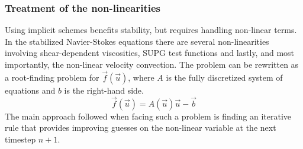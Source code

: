 \subsubsection*{Treatment of the non-linearities}
Using implicit schemes benefits stability, but requires handling non-linear terms. In the stabilized Navier-Stokes equations there are several non-linearities involving shear-dependent viscosities, SUPG test functions and lastly, and most importantly, the non-linear velocity convection. The problem can be rewritten as a root-finding problem for $\vec{f}(\vec{u})$, where $A$ is the fully discretized system of equations and $b$ is the right-hand side.
\begin{equation*}
	\vec{f}(\vec{u}) = A(\vec{u})\vec{u} - \vec{b}
\end{equation*}
The main approach followed when facing such a problem is finding an iterative rule that provides improving guesses on the non-linear variable at the next timestep $n+1$.

